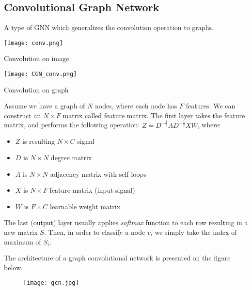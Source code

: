 \subsection{Convolutional Graph Network}
\begin{frame}[allowframebreaks]{\subsecname}
   A type of GNN which generalizes the convolution operation to graphs.

   \begin{multicols}{2}
      \centering
      \texttt{[image: conv.png]}
      \caption{Convolution on image}
      \hfill
      \centering
      \texttt{[image: CGN\_conv.png]}
      \caption{Convolution on graph}
   \end{multicols}
   
   \framebreak

   Assume we have a graph of $N$ nodes, where each node has $F$ features.
   We can construct an $N \times F$ matrix called feature matrix.
   The first layer takes the feature matrix, and performs the following operation: $Z = D^{-\frac{1}{2}} A D^{-\frac{1}{2}} X W$, where:
   \begin{itemize}
       \item $Z$ is resulting $N \times C$ signal
       \item $D$ is $N \times N$ degree matrix
       \item $A$ is $N \times N$ adjacency matrix with self-loops
       \item $X$ is $N \times F$ feature matrix (input signal)
       \item $W$ is $F \times C$ learnable weight matrix
   \end{itemize}

   The last (output) layer usually applies \emph{softmax} function to each row resulting in a new matrix $S$.
   Then, in order to classify a node $v_i$ we simply take the index of maximum of $S_i$.
   
   \framebreak

   The architecture of a graph convolutional network is presented on the figure below.
   \begin{figure}[h]
       \centering
       \texttt{[image: gcn.jpg]}
   \end{figure}
\end{frame}

